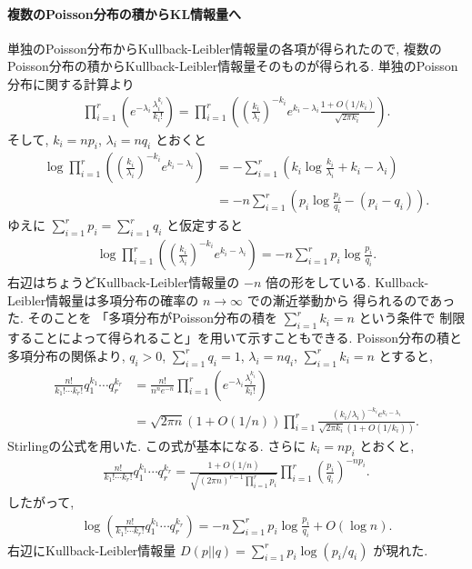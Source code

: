 \documentclass[12pt,twoside]{jarticle}
\theoremstyle{jplain}
\theoremstyle{jplain}
\theoremstyle{jplain}
\numberwithin{theorem}{section}
\numberwithin{equation}{section}
\numberwithin{figure}{section}
\numberwithin{table}{section}
\begin{document}
\paragraph{複数のPoisson分布の積からKL情報量へ}
単独のPoisson分布からKullback-Leibler情報量の各項が得られたので, 
複数のPoisson分布の積からKullback-Leibler情報量そのものが得られる.
単独のPoisson分布に関する計算より
\begin{align*}
\prod_{i=1}^r\left(e^{-\lambda_i}\frac{\lambda_i^{k_i}}{k_i!}\right)
=\prod_{i=1}^r
\left(
\left(\frac{k_i}{\lambda_i}\right)^{-k_i}e^{k_i-\lambda_i}\frac{1+O(1/k_i)}{\sqrt{2\pi k_i}}
\right).
\end{align*}
そして, $k_i=np_i$, $\lambda_i=nq_i$ とおくと
\begin{align*}
\log\prod_{i=1}^r
\left(
\left(\frac{k_i}{\lambda_i}\right)^{-k_i}e^{k_i-\lambda_i}
\right)
&=-\sum_{i=1}^r\left(k_i\log\frac{k_i}{\lambda_i}+k_i-\lambda_i\right)
\\ &
=-n\sum_{i=1}^r\left(p_i\log\frac{p_i}{q_i}-(p_i-q_i)\right).
\end{align*}
ゆえに $\sum_{i=1}^r p_i=\sum_{i=1}^r q_i$ と仮定すると
\begin{align*}
\log\prod_{i=1}^r
\left(
\left(\frac{k_i}{\lambda_i}\right)^{-k_i}e^{k_i-\lambda_i}
\right)
=-n\sum_{i=1}^r p_i\log\frac{p_i}{q_i}.
\end{align*}
右辺はちょうどKullback-Leibler情報量の $-n$ 倍の形をしている.
Kullback-Leibler情報量は多項分布の確率の $n\to\infty$ での漸近挙動から
得られるのであった. そのことを
「多項分布がPoisson分布の積を $\sum_{i=1}^r k_i=n$ という条件で
制限することによって得られること」を用いて示すこともできる.
Poisson分布の積と多項分布の関係より, 
$q_i>0$, $\sum_{i=1}^r q_i=1$, $\lambda_i=nq_i$, $\sum_{i=1}^r k_i=n$ とすると, 
\begin{align*}
\frac{n!}{k_1!\cdots k_r!} q_1^{k_1}\cdots q_r^{k_r}
&=\frac{n!}{n^n e^{-n}}
\prod_{i=1}^r \left( e^{-\lambda_i}\frac{\lambda_i^{k_i}}{k_i!} \right)
\\ &
=
\sqrt{2\pi n}(1+O(1/n))
\prod_{i=1}^r \frac{(k_i/\lambda_i)^{-k_i} e^{k_i-\lambda_i}}{\sqrt{2\pi k_i}(1+O(1/k_i))}.
\end{align*}
Stirlingの公式を用いた. この式が基本になる.
さらに $k_i=np_i$ とおくと, 
\begin{align*}
\frac{n!}{k_1!\cdots k_r!} q_1^{k_1}\cdots q_r^{k_r}
=\frac{1+O(1/n)}{\sqrt{(2\pi n)^{r-1}\prod_{i=1}^r p_i}}
\prod_{i=1}^r\left(\frac{p_i}{q_i}\right)^{-np_i}.
\end{align*}
したがって,
\begin{align*}
\log\left(\frac{n!}{k_1!\cdots k_r!} q_1^{k_1}\cdots q_r^{k_r}\right)
=-n\sum_{i=1}^r p_i\log\frac{p_i}{q_i} + O(\log n).
\end{align*}
右辺にKullback-Leibler情報量 $D(p||q)=\sum_{i=1}^r p_i\log(p_i/q_i)$ が現れた.
\end{document}
